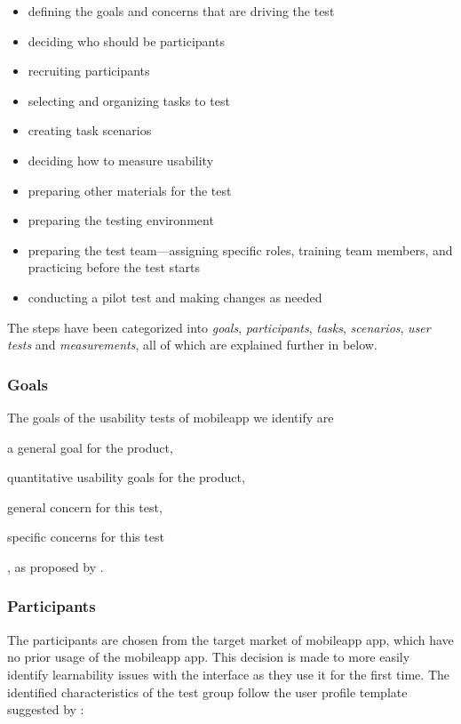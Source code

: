 \begin{itemize}[noitemsep]
  \item defining the goals and concerns that are driving the test
  \item deciding who should be participants
  \item recruiting participants
  \item selecting and organizing tasks to test
  \item creating task scenarios
  \item deciding how to measure usability
  \item preparing other materials for the test
  \item preparing the testing environment
  \item preparing the test team---assigning specific roles, training team members, and practicing before the test starts
  \item conducting a pilot test and making changes as needed
\end{itemize}

The steps have been categorized into \textit{goals}, \textit{participants}, \textit{tasks}, \textit{scenarios}, \textit{user tests} and \textit{measurements}, all of which are explained further in below.

\subsubsection{Goals}
\label{subsubsec:goals}
The goals of the usability tests of mobileapp we identify are \begin{enumerate*}[label=(\(\arabic*\))]
  \item a general goal for the product,
  \item quantitative usability goals for the product,
  \item general concern for this test,
  \item specific concerns for this test
\end{enumerate*}, as proposed by \cite{Dumas1999}.

\subsubsection{Participants}
\label{subsubsec:participants}
The participants are chosen from the target market of mobileapp app, which have no prior usage of the mobileapp app. This decision is made to more easily identify learnability issues with the interface as they use it for the first time. The identified characteristics of the test group follow the user profile template suggested by \cite{Dumas1999}:

